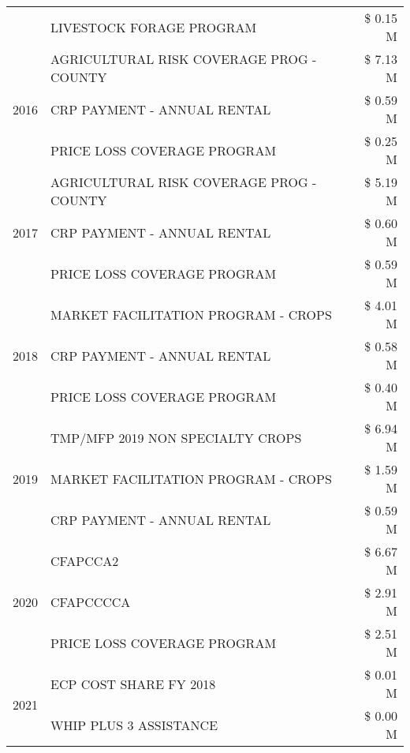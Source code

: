 \begin{tabular}{llr}
 & LIVESTOCK FORAGE PROGRAM & \$ 0.15 M \\
\cline{1-3}
\multirow[t]{3}{*}{2016} & AGRICULTURAL RISK COVERAGE PROG - COUNTY & \$ 7.13 M \\
 & CRP PAYMENT - ANNUAL RENTAL & \$ 0.59 M \\
 & PRICE LOSS COVERAGE PROGRAM & \$ 0.25 M \\
\cline{1-3}
\multirow[t]{3}{*}{2017} & AGRICULTURAL RISK COVERAGE PROG - COUNTY & \$ 5.19 M \\
 & CRP PAYMENT - ANNUAL RENTAL & \$ 0.60 M \\
 & PRICE LOSS COVERAGE PROGRAM & \$ 0.59 M \\
\cline{1-3}
\multirow[t]{3}{*}{2018} & MARKET FACILITATION PROGRAM - CROPS & \$ 4.01 M \\
 & CRP PAYMENT - ANNUAL RENTAL & \$ 0.58 M \\
 & PRICE LOSS COVERAGE PROGRAM & \$ 0.40 M \\
\cline{1-3}
\multirow[t]{3}{*}{2019} & TMP/MFP 2019 NON SPECIALTY CROPS & \$ 6.94 M \\
 & MARKET FACILITATION PROGRAM - CROPS & \$ 1.59 M \\
 & CRP PAYMENT - ANNUAL RENTAL & \$ 0.59 M \\
\cline{1-3}
\multirow[t]{3}{*}{2020} & CFAPCCA2 & \$ 6.67 M \\
 & CFAPCCCCA & \$ 2.91 M \\
 & PRICE LOSS COVERAGE PROGRAM & \$ 2.51 M \\
\cline{1-3}
\multirow[t]{2}{*}{2021} & ECP COST SHARE FY 2018 & \$ 0.01 M \\
 & WHIP PLUS 3 ASSISTANCE & \$ 0.00 M \\
\cline{1-3}
\bottomrule
\end{tabular}
